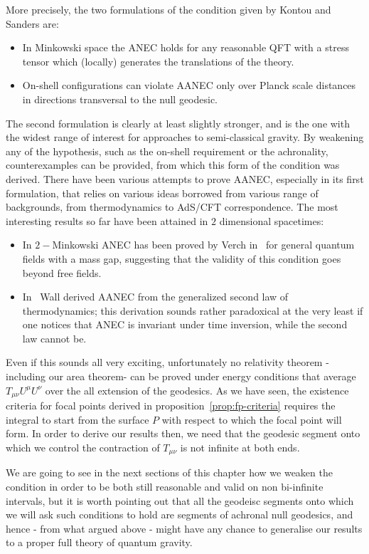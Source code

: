 More precisely, the two formulations of the condition given by Kontou and Sanders are:
\begin{itemize}
    \item[\ding{99}] In Minkowski space the ANEC holds for any reasonable QFT with a stress tensor which (locally) generates the translations of the theory.
    \item[\ding{99}] On-shell configurations can violate AANEC only over Planck scale distances in directions transversal to the null geodesic.
\end{itemize}
The second formulation is clearly at least slightly stronger, and is the one with the widest range of interest for approaches to semi-classical gravity. By weakening any of the hypothesis, such as the on-shell requirement or the achronality, counterexamples can be provided, from which this form of the condition was derived. 
There have been various attempts to prove AANEC, especially in its first formulation, that relies on various ideas borrowed from various range of backgrounds, from thermodynamics to AdS/CFT correspondence. The most interesting results so far have been attained in \(2\) dimensional spacetimes:
\begin{itemize}
    \item[\ding{99}] In \(2-\)Minkowski ANEC has been proved by Verch in~\cite[]{verch2000averaged} for general quantum fields with a mass gap, suggesting that the validity of this condition goes beyond free fields.
    \item[\ding{99}] In~\cite[]{wall2010proving} Wall derived AANEC from the generalized second law of thermodynamics; this derivation sounds rather paradoxical at the very least if one notices that ANEC is invariant under time inversion, while the second law cannot be.
\end{itemize}

Even if this sounds all very exciting, unfortunately no relativity theorem -including our area theorem- can be proved under energy conditions that average \(T_{\mu\nu}U^{\mu}U^{\nu}\) over the all extension of the geodesics. As we have seen, the existence criteria for focal points derived in proposition~\ref{prop:fp-criteria} requires the integral to start from the surface \(P\) with respect to which the focal point will form. In order to derive our results then, we need that the geodesic segment onto which we control the contraction of \(T_{\mu\nu}\) is not infinite at both ends. 

\noindent
We are going to see in the next sections of this chapter how we weaken the condition in order to be both still reasonable and valid on non bi-infinite intervals, but it is worth pointing out that all the geodeisc segments onto which we will ask such conditions to hold are segments of achronal null geodesics, and hence - from what argued above - might have any chance to generalise our results to a proper full theory of quantum gravity.

